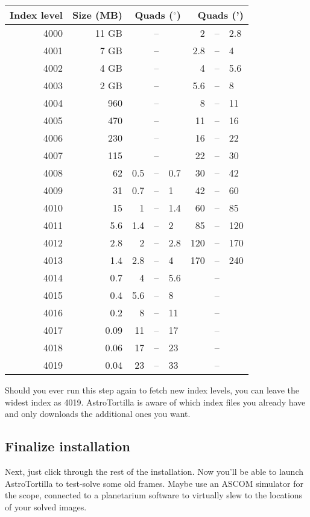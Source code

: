 \documentclass[english]{article}
\begin{document}
\begin{table}[!h]
\centering
\begin{tabular}{r r r @{ } c @{ } l r @{ } c @{ } l} \toprule
Index level 	& Size (MB) & \multicolumn{3}{r}{Quads ($^\circ$)} & \multicolumn{3}{r}{Quads (')} \\ \midrule
4000 & 11 GB 	&  	&--& 		& 2 	&--&	2.8\\
4001 & 7 GB 	&  	&--&  	& 2.8	&--&	4\\
4002 & 4 GB 	&  	&--&  	& 4 	&--&	5.6\\
4003 & 2	GB 	&  	&--&  	& 5.6	&--&	8\\
4004 & 960  	&  	&--&  	& 8 	&--&	11\\
4005 & 470  	&  	&--&  	& 11 	&--&	16\\
4006 & 230  	&  	&--&  	& 16 	&--&	22\\
4007 & 115  	&    	&--&  	& 22 	&--&	30\\
4008 & 62  		& 0.5 &--& 0.7	& 30 	&--&	42\\
4009 & 31  		& 0.7 &--& 1	& 42 	&--&	60\\
4010 & 15  		& 1 	&--& 1.4	& 60 	&--&	85\\
4011 & 5.6  	& 1.4	&--& 2	& 85 	&--&	120\\
4012 & 2.8  	& 2 	&--& 2.8	& 120 &--&	170\\
4013 & 1.4  	& 2.8	&--& 4 	& 170	&--&	240\\
4014 & 0.7  	& 4	&--& 5.6	&		&--&		\\
4015 & 0.4  	& 5.6	&--& 8 	&		&--&		\\
4016 & 0.2  	& 8	&--& 11	&		&--&		\\
4017 & 0.09  	& 11	&--& 17	&		&--&		\\
4018 & 0.06  	& 17	&--& 23	&		&--&		\\
4019 & 0.04  	& 23	&--& 33	&		&--&		\\ \bottomrule
\end{tabular}
\end{table}

Should you ever run this step again to fetch new index levels, you can leave the widest index as 4019. AstroTortilla is aware of which index files you already have and only downloads the additional ones you want.

\subsection{Finalize installation}

Next, just click through the rest of the installation. Now you'll be able to launch AstroTortilla to test-solve some old frames. Maybe use an ASCOM simulator for the scope, connected to a planetarium software to virtually slew to the locations of your solved images.
\end{document}
